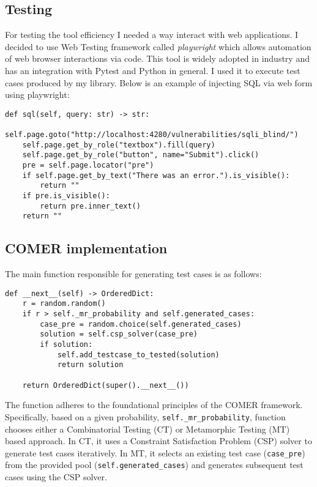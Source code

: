 \subsection{Testing}\label{sec:testing}

For testing the tool efficiency I needed a way interact with web applications. I decided to use Web Testing framework called \textit{playwright} \cite{playwright} which allows automation of web browser interactions via code. This tool is widely adopted in industry and has an integration with Pytest and Python in general. I used it to execute test cases produced by my library. Below is an example of injecting SQL via web form using playwright:

\begin{lstlisting}[label={lst:playwright}]
def sql(self, query: str) -> str:
	self.page.goto("http://localhost:4280/vulnerabilities/sqli_blind/")
	self.page.get_by_role("textbox").fill(query)
	self.page.get_by_role("button", name="Submit").click()
	pre = self.page.locator("pre")
	if self.page.get_by_text("There was an error.").is_visible():
		return ""
	if pre.is_visible():
		return pre.inner_text()
	return ""
\end{lstlisting}

\subsection{COMER implementation}\label{sec:comer-implementation}

The main function responsible for generating test cases is as follows:

\begin{lstlisting}[label={lst:test-case1}]
def __next__(self) -> OrderedDict:
	r = random.random()
	if r > self._mr_probability and self.generated_cases:
		case_pre = random.choice(self.generated_cases)
		solution = self.csp_solver(case_pre)
		if solution:
			self.add_testcase_to_tested(solution)
			return solution

	return OrderedDict(super().__next__())

\end{lstlisting}

The function adheres to the foundational principles of the COMER framework.
Specifically, based on a given probability, \verb|self._mr_probability|, function chooses either a Combinatorial Testing (CT) or Metamorphic Testing (MT) based approach.
In CT, it uses a Constraint Satisfaction Problem (CSP) solver to generate test cases iteratively.
In MT, it selects an existing test case (\verb|case_pre|) from the provided pool (\verb|self.generated_cases|) and generates subsequent test cases using the CSP solver.

